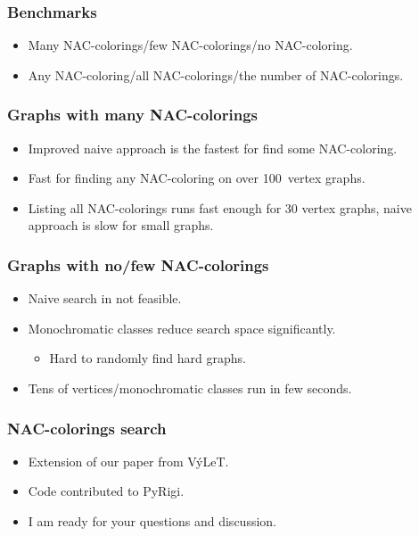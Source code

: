 \documentclass[aspectratio=\myaspectratio]{beamer}
\begin{document}


\begin{frame}
	\frametitle{Benchmarks}
	\begin{itemize}
		\item
		      Many NAC-colorings/few NAC-colorings/no NAC-coloring.
		\item
		      Any NAC-coloring/all NAC-colorings/the number of NAC-colorings.
	\end{itemize}
\end{frame}

\begin{frame}
	\frametitle{Graphs with many NAC-colorings}
	\begin{itemize}
		\item
		      Improved naive approach is the fastest for find some NAC-coloring.
		\item
		      Fast for finding any NAC-coloring on over 100 vertex graphs.
		\item
		      Listing all NAC-colorings runs fast enough for 30 vertex graphs,
		      naive approach is slow for small graphs.
	\end{itemize}
\end{frame}

\begin{frame}
	\frametitle{Graphs with no/few NAC-colorings}
	\begin{itemize}
		\item
		      Naive search in not feasible.
		\item
		      Monochromatic classes reduce search space significantly.
		      \begin{itemize}
			      \item Hard to randomly find hard graphs.
		      \end{itemize}
		\item
		      Tens of vertices/monochromatic classes run in few seconds.
	\end{itemize}
\end{frame}

\begin{frame}
	\frametitle{NAC-colorings search}
	\begin{itemize}
		\item
		      Extension of our paper from VýLeT.
		\item
		      Code contributed to PyRigi.
		\item
		      I am ready for your questions and discussion.
	\end{itemize}
\end{frame}
\end{document}
